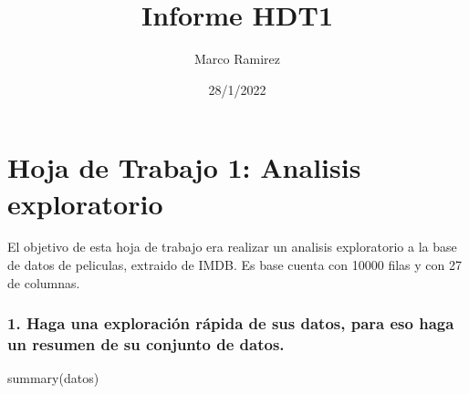 \documentclass[
]{article}
\title{Informe HDT1}
\author{Marco Ramirez}
\date{28/1/2022}
\newenvironment{Shaded}{\begin{snugshade}}{\end{snugshade}}
\newcommand{\FunctionTok}[1]{\textcolor[rgb]{0.00,0.00,0.00}{#1}}
\newcommand{\NormalTok}[1]{#1}
\begin{document}
\maketitle

\hypertarget{hoja-de-trabajo-1-analisis-exploratorio}{%
\section{Hoja de Trabajo 1: Analisis
exploratorio}\label{hoja-de-trabajo-1-analisis-exploratorio}}

El objetivo de esta hoja de trabajo era realizar un analisis
exploratorio a la base de datos de peliculas, extraido de IMDB. Es base
cuenta con 10000 filas y con 27 de columnas.

\hypertarget{haga-una-exploraciuxf3n-ruxe1pida-de-sus-datos-para-eso-haga-un-resumen-de-su-conjunto-de-datos.}{%
\subsubsection{1. Haga una exploración rápida de sus datos, para eso
haga un resumen de su conjunto de
datos.}\label{haga-una-exploraciuxf3n-ruxe1pida-de-sus-datos-para-eso-haga-un-resumen-de-su-conjunto-de-datos.}}

\begin{Shaded}
\begin{Highlighting}[]
\FunctionTok{summary}\NormalTok{(datos)}
\end{Highlighting}
\end{Shaded}
\end{document}
